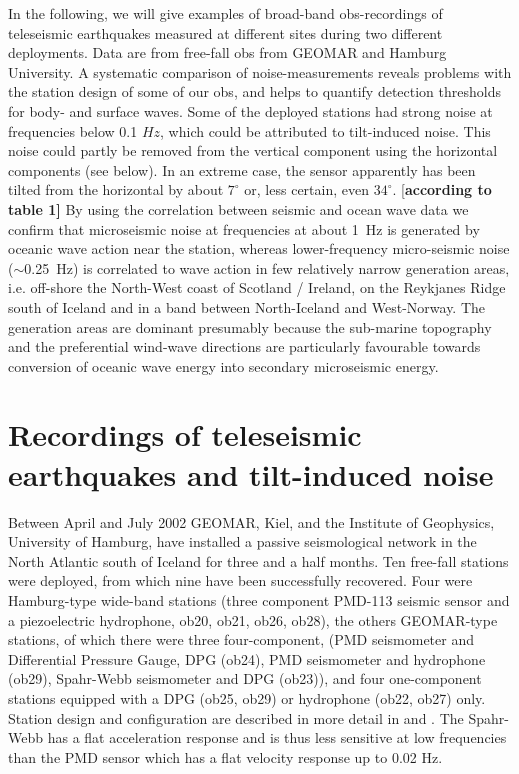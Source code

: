 \documentclass{article}
\providecommand{\remark}[1]{{\typeout{REMARK (p.\arabic{page}): #1}[\bf #1]}}
\begin{document}
{In the following, we will 
give examples of broad-band obs-recordings of teleseismic 
earthquakes measured at different sites 
during two different deployments.
Data are from free-fall obs from GEOMAR and Hamburg University.
A systematic comparison 
of  noise-measurements reveals problems with the station design of some of our
obs, and helps to quantify detection thresholds for body- and surface waves.
Some of the deployed stations had strong noise 
at frequencies below 0.1 $Hz$, which could be attributed to
tilt-induced noise. This noise could partly be removed from the
vertical component using the horizontal components (see below).
In an extreme case, the sensor apparently has been 
tilted 
from the horizontal by about $7^{\circ}$ or, less certain, even
$34^{\circ}$. \remark{according to table 1}
By using the correlation between seismic and ocean wave data we
confirm that microseismic noise at
frequencies at about 1~Hz is generated by oceanic wave action near the
station, whereas lower-frequency micro-seismic noise
($\sim$0.25~Hz) is correlated to wave action in few relatively narrow generation
areas, i.e. 
off-shore the North-West coast of
Scotland / Ireland, on the Reykjanes Ridge south of Iceland and in a band 
between North-Iceland and West-Norway.
The generation areas are dominant presumably because the
sub-marine topography and the preferential wind-wave directions 
are particularly favourable towards
conversion of oceanic wave energy into secondary microseismic energy.

\section{Recordings of teleseismic earthquakes 
and tilt-induced noise
}
Between April and July 2002 
GEOMAR, Kiel, and the Institute of Geophysics, University of Hamburg, 
have installed a passive seismological network
in the North Atlantic south of Iceland
for three and a half months.
Ten free-fall stations were deployed, from which nine have been successfully recovered.
Four were 
Hamburg-type wide-band stations
(three component PMD-113 seismic sensor and a piezoelectric 
hydrophone,
ob20, ob21, ob26, ob28),
the others GEOMAR-type stations, of which there were 
three four-component, (PMD seismometer and Differential Pressure
Gauge, DPG (ob24), PMD seismometer and 
 hydrophone (ob29), Spahr-Webb seismometer and
DPG (ob23)),
 and four 
one-component stations equipped  with a DPG (ob25, ob29) or hydrophone
(ob22, ob27) only. 
Station design and configuration are described in more detail in 
\cite{dahm:02} and
\cite{flueh:99}.  The Spahr-Webb has a flat acceleration response and is thus less sensitive 
at low frequencies than the PMD sensor which has a flat velocity
response up to 0.02 Hz.

}
\end{document}
